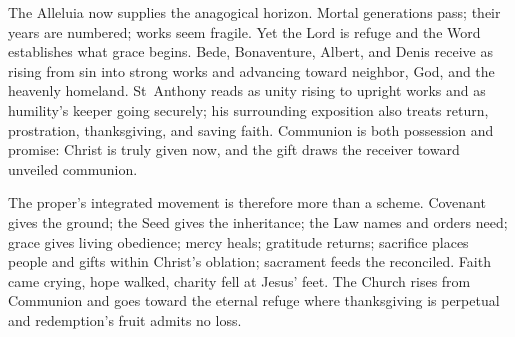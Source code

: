 The Alleluia now supplies the anagogical horizon. Mortal generations pass;
their years are numbered; works seem fragile. Yet the Lord is refuge and the
Word establishes what grace begins. Bede, Bonaventure, Albert, and Denis
receive  as rising from sin into strong works and advancing
toward neighbor, God, and the heavenly homeland. St~Anthony reads
 as unity rising to upright works and  as humility's
keeper going securely; his surrounding exposition also treats return,
prostration, thanksgiving, and saving faith.
Communion is both
possession and promise: Christ is truly given now, and the gift draws the
receiver toward unveiled communion.

The proper's integrated movement is therefore more than a scheme. Covenant gives the ground; the Seed gives the inheritance; the Law
names and orders need; grace gives living obedience; mercy heals; gratitude
returns; sacrifice places people and gifts within Christ's oblation; sacrament
feeds the reconciled. Faith came crying, hope walked, charity fell at Jesus'
feet. The Church rises from Communion and goes toward the eternal refuge where
thanksgiving is perpetual and redemption's fruit admits no loss.
